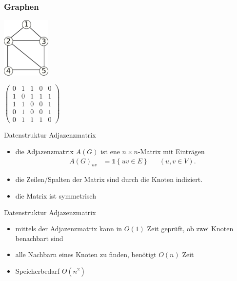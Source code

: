 \documentclass[aspectratio=1610, 11pt]{beamer}
\newcommand\bc[1]{\left({#1}\right)}
\newcommand\cbc[1]{\left\{{#1}\right\}}
\newcommand{\vecone}{\mathbb{1}}
\newcommand{\mytitle}{Graphen}
\begin{document}
\begin{frame}\frametitle{\mytitle}
	\includegraphics[height=30mm]{images/house.pdf}\hfill\parbox[t]{50mm}{\vspace{-26mm}$\bc{\begin{array}{ccccc}0&1&1&0&0\\1&0&1&1&1\\1&1&0&0&1\\0&1&0&0&1\\0&1&1&1&0\end{array}}$}
	\begin{overprint}
		\begin{exampleblock}{Datenstruktur Adjazenzmatrix}
			\begin{itemize}
				\item die Adjazenzmatrix $A(G)$ ist ene $n\times n$-Matrix mit Eintr\"agen
					\begin{align*}
						A(G)_{uv}&=\vecone\cbc{uv\in E}&&(u,v\in V).
					\end{align*}
				\item die Zeilen/Spalten der Matrix sind durch die Knoten indiziert.
				\item die Matrix ist symmetrisch
			\end{itemize}
		\end{exampleblock}
		\begin{exampleblock}{Datenstruktur Adjazenzmatrix}
			\begin{itemize}
				\item mittels der Adjazenzmatrix kann in $O(1)$ Zeit gepr\"uft, ob zwei Knoten benachbart sind
				\item alle Nachbarn eines Knoten zu finden, ben\"otigt $O(n)$ Zeit
				\item Speicherbedarf $\Theta(n^2)$
			\end{itemize}
		\end{exampleblock}
	\end{overprint}
\end{frame}
\end{document}
